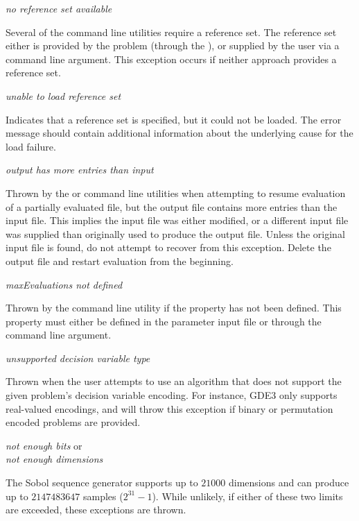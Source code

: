 \noindent
\textit{no reference set available}
\begin{indented}
  Several of the command line utilities require a reference set.  The reference set either is provided by the problem (through the ), or supplied by the user via a command line argument.  This exception occurs if neither approach provides a reference set.
\end{indented}

\noindent
\textit{unable to load reference set}
\begin{indented}
  Indicates that a reference set is specified, but it could not be loaded. The error message should contain additional information about the underlying cause for the load failure.
\end{indented}

\noindent
\textit{output has more entries than input}
\begin{indented}
  Thrown by the  or  command line utilities when attempting to resume evaluation of a partially evaluated file, but the output file contains more entries than the input file.  This implies the input file was either modified, or a different input file was supplied than originally used to produce the output file.  Unless the original input file is found, do not attempt to recover from this exception.  Delete the output file and restart evaluation from the beginning.
\end{indented}

\noindent
\textit{maxEvaluations not defined}
\begin{indented}
  Thrown by the  command line utility if the  property has not been defined.  This property must either be defined in the parameter input file or through the  command line argument.
\end{indented}

\noindent
\textit{unsupported decision variable type}
\begin{indented}
  Thrown when the user attempts to use an algorithm that does not support the given problem's decision variable encoding.  For instance, GDE3 only supports real-valued encodings, and will throw this exception if binary or permutation encoded problems are provided.
\end{indented}

\noindent
\textit{not enough bits} or\\
\textit{not enough dimensions}
\begin{indented}
  The Sobol sequence generator supports up to $21000$ dimensions and can produce up to $2147483647$ samples ($2^{31}-1$).  While unlikely, if either of these two limits are exceeded, these exceptions are thrown.
\end{indented}

